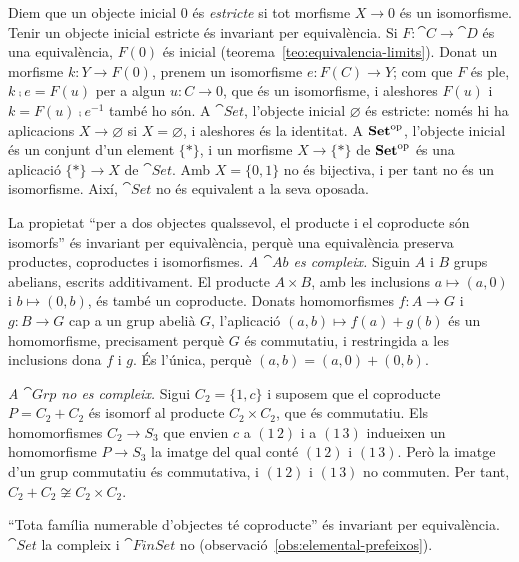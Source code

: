 \begin{exemple}
Diem que un objecte inicial $0$ és \emph{estricte} si tot morfisme $X\to0$ és un isomorfisme. Tenir un objecte inicial estricte és invariant per equivalència. Si $F\colon\cat{C}\to\cat{D}$ és una equivalència, $F(0)$ és inicial (teorema~\ref{teo:equivalencia-limits}). Donat un morfisme $k\colon Y\to F(0)$, prenem un isomorfisme $e\colon F(C)\to Y$; com que $F$ és ple, $k\comp e=F(u)$ per a algun $u\colon C\to0$, que és un isomorfisme, i aleshores $F(u)$ i $k=F(u)\comp e^{-1}$ també ho són. A $\cat{Set}$, l'objecte inicial $\varnothing$ és estricte: només hi ha aplicacions $X\to\varnothing$ si $X=\varnothing$, i aleshores és la identitat. A $\mathbf{Set}^{\mathrm{op}}$, l'objecte inicial és un conjunt d'un element $\{\ast\}$, i un morfisme $X\to\{\ast\}$ de $\mathbf{Set}^{\mathrm{op}}$ és una aplicació $\{\ast\}\to X$ de $\cat{Set}$. Amb $X=\{0,1\}$ no és bijectiva, i per tant no és un isomorfisme. Així, $\cat{Set}$ no és equivalent a la seva oposada.
\end{exemple}

\begin{exemple}
La propietat \enquote{per a dos objectes qualssevol, el producte i el coproducte són isomorfs} és invariant per equivalència, perquè una equivalència preserva productes, coproductes i isomorfismes. 
\emph{A $\cat{Ab}$ es compleix.} Siguin $A$ i $B$ grups abelians, escrits additivament. El producte $A\times B$, amb les inclusions $a\mapsto(a,0)$ i $b\mapsto(0,b)$, és també un coproducte. Donats homomorfismes $f\colon A\to G$ i $g\colon B\to G$ cap a un grup abelià $G$, l'aplicació $(a,b)\mapsto f(a)+g(b)$ és un homomorfisme, precisament perquè $G$ és commutatiu, i restringida a les inclusions dona $f$ i $g$. És l'única, perquè $(a,b)=(a,0)+(0,b)$.

\emph{A $\cat{Grp}$ no es compleix.} Sigui $C_2=\{1,c\}$ i suposem que el coproducte $P=C_2+C_2$ és isomorf al producte $C_2\times C_2$, que és commutatiu. Els homomorfismes $C_2\to S_3$ que envien $c$ a $(1\,2)$ i a $(1\,3)$ indueixen un homomorfisme $P\to S_3$ la imatge del qual conté $(1\,2)$ i $(1\,3)$. Però la imatge d'un grup commutatiu és commutativa, i $(1\,2)$ i $(1\,3)$ no commuten. Per tant, $C_2+C_2\not\cong C_2\times C_2$.
\end{exemple}

\begin{exemple}
\enquote{Tota família numerable d'objectes té coproducte} és invariant per equivalència. $\cat{Set}$ la compleix i $\cat{FinSet}$ no (observació~\ref{obs:elemental-prefeixos}).
\end{exemple}

